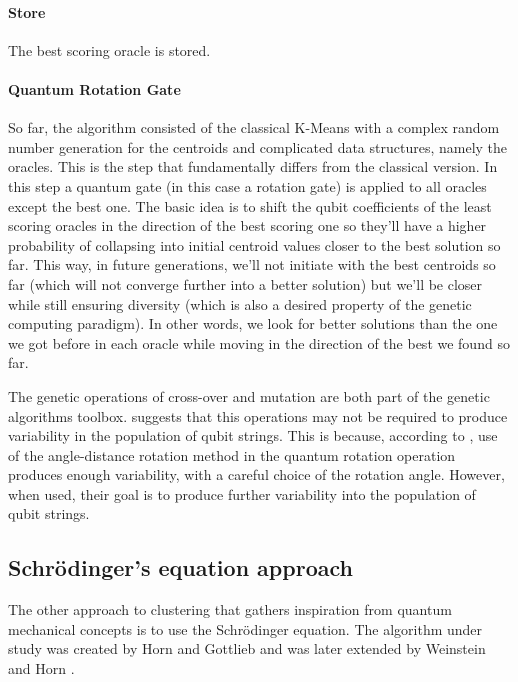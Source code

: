 \paragraph{Store}
The best scoring oracle is stored.

\paragraph{Quantum Rotation Gate}
So far, the algorithm consisted of the classical K-Means with a complex random number generation for the centroids and complicated data structures, namely the oracles.
This is the step that fundamentally differs from the classical version.
In this step a quantum gate (in this case a rotation gate) is applied to all oracles except the best one.
The basic idea is to shift the qubit coefficients of the least scoring oracles in the direction of the best scoring one so they'll have a higher probability of collapsing into initial centroid values closer to the best solution so far.
This way, in future generations, we'll not initiate with the best centroids so far (which will not converge further into a better solution) but we'll be closer while still ensuring diversity (which is also a desired property of the genetic computing paradigm).
In other words, we look for better solutions than the one we got before in each oracle while moving in the direction of the best we found so far.

The genetic operations of cross-over and mutation are both part of the genetic algorithms toolbox. \cite{Wiebe2014} suggests that this operations may not be required to produce variability in the population of qubit strings.
This is because, according to \cite{Liu2010}, use of the angle-distance rotation method in the quantum rotation operation produces enough variability, with a careful choice of the rotation angle.
However, when used, their goal is to produce further variability into the population of qubit strings.

\subsection{Schrödinger's equation approach}%
\label{sec:horn}

The other approach to clustering that gathers inspiration from quantum mechanical concepts is to use the Schrödinger equation.
The algorithm under study was created by Horn and Gottlieb \cite{Horn2010} and was later extended by Weinstein and Horn \cite{Weinstein2009}.

